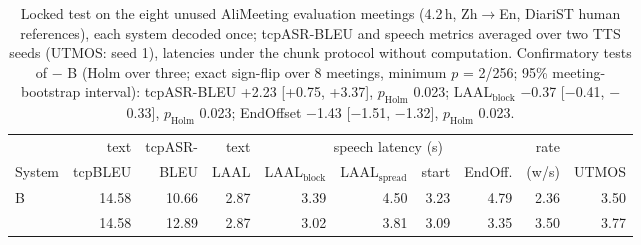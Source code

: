 \begin{table}[!t]
\centering\small
\setlength{\tabcolsep}{3.5pt}
\begin{tabular}{lrrrrrrrrr}
\toprule
 & text & tcpASR- & text & \multicolumn{4}{c}{speech latency (s)} & rate & \\
\cmidrule(lr){5-8}
System & tcpBLEU & BLEU & LAAL & LAAL$_\text{block}$ & LAAL$_\text{spread}$ & start & EndOff. & (w/s) & UTMOS \\
\midrule
B & 14.58 & 10.66 & 2.87 & 3.39 & 4.50 & 3.23 & 4.79 & 2.36 & 3.50 \\
\sys{} & 14.58 & 12.89 & 2.87 & 3.02 & 3.81 & 3.09 & 3.35 & 3.50 & 3.77 \\
\bottomrule
\end{tabular}
\caption{Locked test on the eight unused AliMeeting evaluation meetings (4.2\,h, Zh$\rightarrow$En, DiariST human references), each system decoded once; tcpASR-BLEU and speech metrics averaged over two TTS seeds (UTMOS: seed 1), latencies under the chunk protocol without computation. Confirmatory tests of \sys{} $-$ B (Holm over three; exact sign-flip over 8 meetings, minimum $p$ = 2/256; 95\% meeting-bootstrap interval): tcpASR-BLEU +2.23 [+0.75, +3.37], $p_\text{Holm}$ 0.023; LAAL$_\text{block}$ $-$0.37 [$-$0.41, $-$0.33], $p_\text{Holm}$ 0.023; EndOffset $-$1.43 [$-$1.51, $-$1.32], $p_\text{Holm}$ 0.023.}
\label{tab:alieval}
\end{table}
